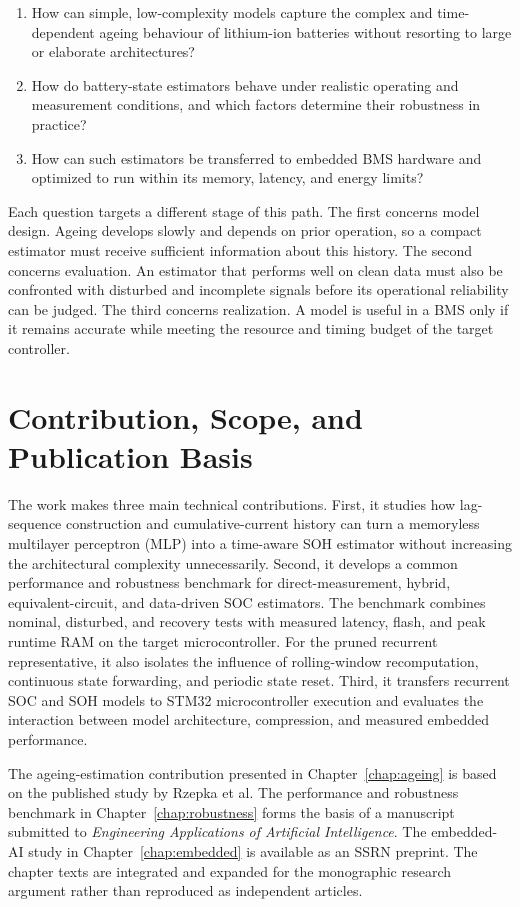 \documentclass[
    a4paper,
    12pt,
    titlepage,
    bibliography=totoc,
    twoside=on,
    parskip=false,
    numbers=noenddot,
    cleardoublepage=empty,
    DIV=12,
    BCOR=12.0mm,
    headheight=36pt,
    headings=openright
]{scrreprt}
\begin{document}
\begin{enumerate}[leftmargin=*]
\item How can simple, low-complexity models capture the complex and time-dependent ageing behaviour of lithium-ion batteries without resorting to large or elaborate architectures?
\item How do battery-state estimators behave under realistic operating and measurement conditions, and which factors determine their robustness in practice?
\item How can such estimators be transferred to embedded BMS hardware and optimized to run within its memory, latency, and energy limits?
\end{enumerate}

Each question targets a different stage of this path. The first concerns model design. Ageing develops slowly and depends on prior operation, so a compact estimator must receive sufficient information about this history. The second concerns evaluation. An estimator that performs well on clean data must also be confronted with disturbed and incomplete signals before its operational reliability can be judged. The third concerns realization. A model is useful in a BMS only if it remains accurate while meeting the resource and timing budget of the target controller.

\section{Contribution, Scope, and Publication Basis}
The work makes three main technical contributions. First, it studies how lag-sequence construction and cumulative-current history can turn a memoryless multilayer perceptron (MLP) into a time-aware SOH estimator without increasing the architectural complexity unnecessarily. Second, it develops a common performance and robustness benchmark for direct-measurement, hybrid, equivalent-circuit, and data-driven SOC estimators. The benchmark combines nominal, disturbed, and recovery tests with measured latency, flash, and peak runtime RAM on the target microcontroller. For the pruned recurrent representative, it also isolates the influence of rolling-window recomputation, continuous state forwarding, and periodic state reset. Third, it transfers recurrent SOC and SOH models to STM32 microcontroller execution and evaluates the interaction between model architecture, compression, and measured embedded performance.

The ageing-estimation contribution presented in Chapter~\ref{chap:ageing} is based on the published study by Rzepka et al.\autocite{rzepkaNeuralNetworkArchitecture2023a} The performance and robustness benchmark in Chapter~\ref{chap:robustness} forms the basis of a manuscript submitted to \emph{Engineering Applications of Artificial Intelligence}.\autocite{rzepkaPerformanceBenchmarkSubmitted2026} The embedded-AI study in Chapter~\ref{chap:embedded} is available as an SSRN preprint.\autocite{rzepkaEmbeddedArtificialIntelligence2026} The chapter texts are integrated and expanded for the monographic research argument rather than reproduced as independent articles.
\end{document}
